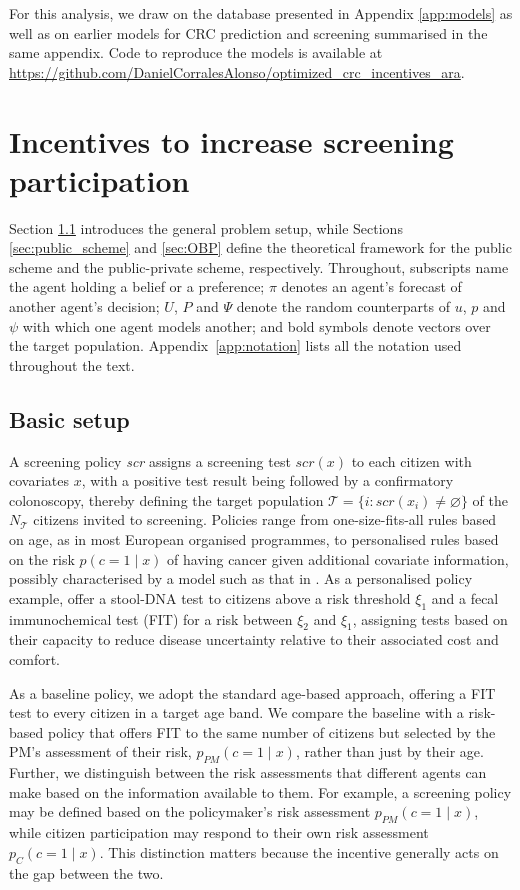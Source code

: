 \documentclass[12pt]{article}
\begin{document}
For this analysis, we draw on the database presented in Appendix \ref{app:models} as well as on earlier models for CRC prediction \citep{corrales2024colorectal} and screening \citep{corrales2025decision} summarised in the same appendix. Code to reproduce the models is available at \url{https://github.com/DanielCorralesAlonso/optimized_crc_incentives_ara}.

\section{Incentives to increase screening participation} \label{sec:incentive_problem_definition}
Section \ref{sec:basic_setup} introduces the general problem setup, while Sections \ref{sec:public_scheme} and \ref{sec:OBP} define the theoretical framework for the public scheme and the public-private scheme, respectively. Throughout, subscripts name the agent holding a belief or a preference; $\pi$ denotes an agent's forecast of another agent's decision; $U$, $P$ and $\Psi$ denote the random counterparts of $u$, $p$ and $\psi$ with which one agent models another; and bold symbols denote vectors over the target population. Appendix~\ref{app:notation} lists all the notation used throughout the text.

\subsection{Basic setup} \label{sec:basic_setup}
A screening policy \emph{scr} assigns a screening test $scr(x)$ to each citizen with covariates $x$, with a positive test result being followed by a confirmatory colonoscopy, thereby defining the target population $\mathcal{T} = \{ i: scr(x_i) \neq \varnothing \}$ of the $N_{\mathcal{T}}$ citizens invited to screening. Policies range from one-size-fits-all rules based on age, as in most European organised programmes, to personalised rules based on the risk  $p( c = 1 \mid x)$ of having cancer given additional covariate information, possibly characterised by a model such as that in \cite{corrales2024colorectal}. As a personalised policy example, \cite{corrales2025decision} offer a stool-DNA test to citizens above a risk threshold $\xi_1$ and a fecal immunochemical test (FIT) for a risk between $\xi_2$ and $\xi_1$, assigning tests based on their capacity to reduce disease uncertainty relative to their associated cost and comfort.

As a baseline policy, we adopt the standard age-based approach, offering a FIT test to every citizen in a target age band. We compare the baseline with a risk-based policy that offers FIT to the same number of citizens but selected by the PM's assessment of their risk, $p_{PM}(c = 1 \mid x)$, rather than just by their age. Further, we distinguish between the risk assessments that different agents can make based on the information available to them. For example, a screening policy may be defined based on the policymaker's risk assessment $p_{PM}(c = 1 \mid x)$, while citizen participation may respond to their own risk assessment $p_C(c=1 \mid x)$. This distinction matters because the incentive generally acts on the gap between the two.
\end{document}

